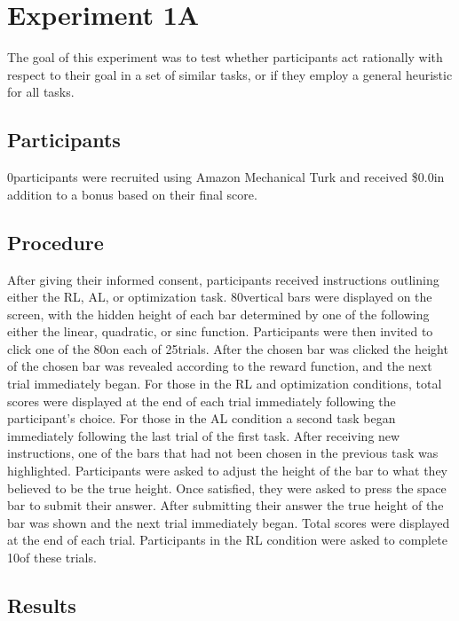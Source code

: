 \documentclass[10pt,letterpaper]{article}
\def\numtrials{25}
\def\numtrialsminerror{10}
\def\numbars{80}
\def\basepay{\$0.0}
\def\numpartA{0}
\begin{document}
	\section{Experiment 1A}
	
	The goal of this experiment was to test whether participants act rationally with respect to their goal in a set of similar tasks, or if they employ a general heuristic for all tasks.
	
	\subsection{Participants}
	
	\numpartA \space participants were recruited using Amazon Mechanical Turk and received \basepay \space in addition to a bonus based on their final score.
	
	\subsection{Procedure}
	
	After giving their informed consent, participants received instructions outlining either the RL, AL, or optimization task. \numbars \space vertical bars were displayed on the screen, with the hidden height of each bar determined by one of the following either the linear, quadratic, or sinc function. Participants were then invited to click one of the \numbars \space on each of \numtrials \space trials. After the chosen bar was clicked the height of the chosen bar was revealed according to the reward function, and the next trial immediately began. For those in the RL and optimization conditions, total scores were displayed at the end of each trial immediately following the participant's choice. For those in the AL condition a second task began immediately following the last trial of the first task. After receiving new instructions, one of the bars that had not been chosen in the previous task was highlighted. Participants were asked to adjust the height of the bar to what they believed to be the true height. Once satisfied, they were asked to press the space bar to submit their answer. After submitting their answer the true height of the bar was shown and the next trial immediately began. Total scores were displayed at the end of each trial. Participants in the RL condition were asked to complete \numtrialsminerror \space of these trials.
	
	\subsection{Results}
	
\end{document}
